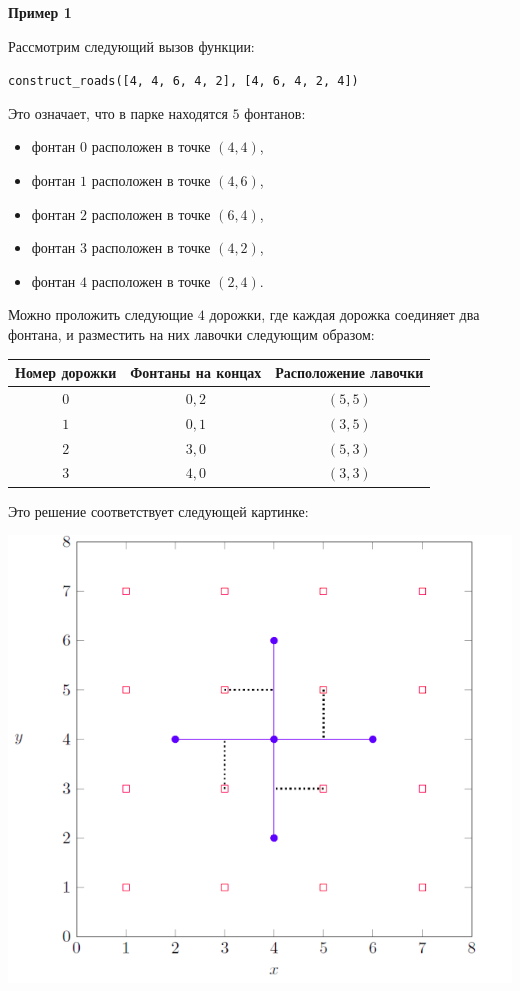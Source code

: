 \textbf{Пример 1}

Рассмотрим следующий вызов функции:

\texttt{construct\_roads([4, 4, 6, 4, 2], [4, 6, 4, 2, 4])}

Это означает, что в парке находятся $5$ фонтанов:
\begin{itemize}
\item фонтан $0$ расположен в точке $(4,4)$,
\item фонтан $1$ расположен в точке $(4,6)$,
\item фонтан $2$ расположен в точке $(6,4)$,
\item фонтан $3$ расположен в точке $(4,2)$,
\item фонтан $4$ расположен в точке $(2,4)$.
\end{itemize}

Можно проложить следующие $4$ дорожки, где каждая дорожка соединяет два фонтана, и разместить на них лавочки следующим образом:


\begin{center}
\renewcommand{\arraystretch}{1.5}
\begin{tabular}{|c|c|c|}
\hline
Номер дорожки & Фонтаны на концах & Расположение лавочки \\
\hline
$0$&$0,2$&$(5,5)$\\
\hline
$1$&$0,1$& $(3,5)$\\
\hline
$2$&$3,0$& $(5,3)$\\
\hline
$3$&$4,0$& $(3,3)$\\
\hline
\end{tabular}
\end{center}


Это решение соответствует следующей картинке:

\includegraphics[scale=0.7]{1.png}

